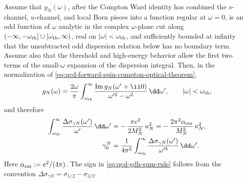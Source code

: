 \begin{proposition}
\label{prop:qcd-gdh-forward-spin-dispersion}
Assume that \(g_N(\omega)\), after the Compton Ward identity has combined the
\(s\)-channel, \(u\)-channel, and local Born pieces into a function regular at
\(\omega=0\), is an odd function of \(\omega\) analytic in the complex
\(\omega\)-plane cut along
\((-\infty,-\omega_{\rm th}]\cup[\omega_{\rm th},\infty)\), real on
\(|\omega|<\omega_{\rm th}\), and sufficiently bounded at infinity that the
unsubtracted odd dispersion relation below has no boundary term.  Assume also
that the threshold and high-energy behavior allow the first two terms of the
small-\(\omega\) expansion of the dispersion integral.  Then, in the
normalization of \eqref{eq:qcd-forward-spin-compton-optical-theorem},
\begin{equation}
  g_N(\omega)
  =
  \frac{2\omega}{\pi}
  \int_{\omega_{\rm th}}^\infty
  \frac{\operatorname{Im}g_N(\omega'+\ii0)}
       {\omega'^2-\omega^2}\,\dd\omega',
  \qquad |\omega|<\omega_{\rm th},
  \label{eq:qcd-forward-spin-odd-dispersion}
\end{equation}
and therefore
\begin{align}
  \int_{\omega_{\rm th}}^\infty
  \frac{\Delta\sigma_{\gamma N}(\omega')}{\omega'}\,\dd\omega'
  &=
  -\,\frac{\pi e^2}{2M_N^2}\,\kappa_N^2
  =
  -\,\frac{2\pi^2\alpha_{\rm em}}{M_N^2}\,\kappa_N^2,
  \label{eq:qcd-gdh-sum-rule}\\
  \gamma_0^N
  &=
  \frac{1}{4\pi^2}
  \int_{\omega_{\rm th}}^\infty
  \frac{\Delta\sigma_{\gamma N}(\omega')}{\omega'^3}\,\dd\omega' .
  \label{eq:qcd-forward-spin-polarizability-sum-rule}
\end{align}
Here \(\alpha_{\rm em}:=e^2/(4\pi)\).  The sign in
\eqref{eq:qcd-gdh-sum-rule} follows from the convention
\(\Delta\sigma_{\gamma N}=\sigma_{1/2}-\sigma_{3/2}\).
\end{proposition}

